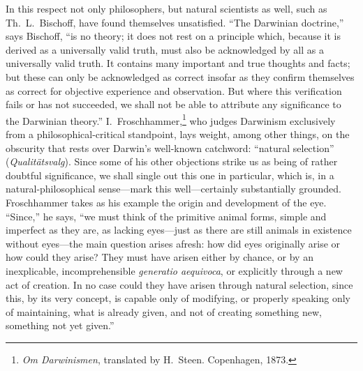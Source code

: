 \documentclass[12pt,a4paper]{article}
\begin{document}
In this respect not only philosophers, but natural scientists as well,
such as Th.\ L.\ Bischoff, have found themselves unsatisfied. ``The
Darwinian doctrine,'' says Bischoff, ``is no theory; it does not rest
on a principle which, because it is derived as a universally valid
truth, must also be acknowledged by all as a universally valid truth.
It contains many important and true thoughts and facts; but these can
only be acknowledged as correct insofar as they confirm themselves as
correct for objective experience and observation. But where this
verification fails or has not succeeded, we shall not be able to
attribute any significance to the Darwinian theory.'' I.\ Froschhammer,\footnote{\emph{Om Darwinismen}, translated by H.\
Steen. Copenhagen, 1873.} who judges Darwinism exclusively from a
philosophical-critical standpoint, lays weight, among other things,
on the obscurity that rests over Darwin's well-known catchword:
``natural selection'' (\emph{Qualit\"atsvalg}). Since some of his
other objections strike us as being of rather doubtful significance,
we shall single out this one in particular, which is, in a
natural-philosophical sense---mark this well---certainly substantially
grounded.
Froschhammer takes as his example the origin and development of the
eye. ``Since,'' he says, ``we must think of the primitive animal forms,
simple and imperfect as they are, as lacking eyes---just as there are
still animals in existence without eyes---the main question arises
afresh: how did eyes originally arise or how could they arise? They
must have arisen either by chance, or by an inexplicable,
incomprehensible \emph{generatio aequivoca}, or explicitly through a
new act of creation. In no case could they have arisen through natural
selection, since this, by its very concept, is capable only of
modifying, or properly speaking only of maintaining, what is already
given, and not of creating something new, something not yet given.''
\end{document}
